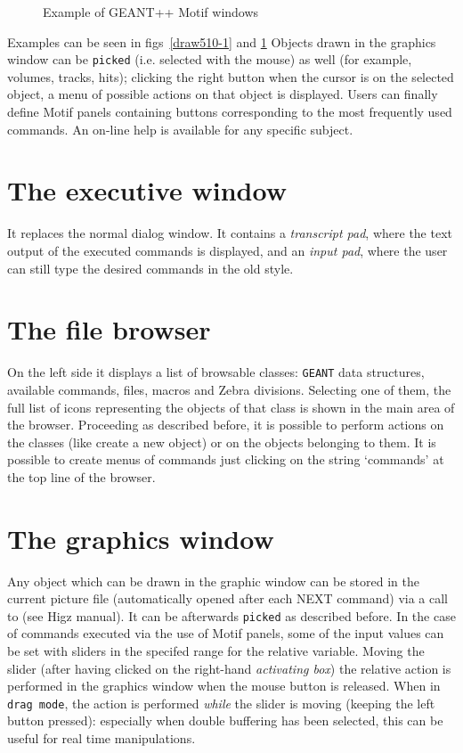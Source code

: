 \begin{figure}[hbt]
\centering
\hspace*{-1.5cm}
\epsfysize=10cm
\label{draw510-2}
\caption{Example of GEANT++ Motif windows}
\end{figure}

Examples can be seen in figs~\ref{draw510-1} and \ref{draw510-2}
Objects drawn in the graphics window can be {\tt picked} 
(i.e. selected with the mouse) as well (for example,
volumes, tracks, hits); clicking the right button when the cursor is on the
selected object, a menu of possible actions on that object is displayed.
Users can finally define Motif panels containing buttons corresponding to the
most frequently used commands. An on-line help is available for any specific
subject.

\section{The executive window}

It replaces the normal dialog window. It contains a {\it transcript pad}, 
where the
text output of the executed commands is displayed, and an {\it input pad}, 
where the
user can still type the desired commands in the old style. \\[1em]

\section{The file browser}

On the left side it displays a list of browsable classes:
{\tt GEANT} data structures, 
available commands, files, macros and Zebra divisions. Selecting one of
them, the full list of icons representing the objects of that class is shown
in the main area of the browser. Proceeding as described before, it is 
possible to perform actions on the classes (like create a new object) or on
the objects belonging to them. It is possible to create menus of commands
just clicking on the string `commands' at the top line of the browser.

\section{The graphics window}

Any object which can be drawn in the graphic window can be stored in the current
picture file (automatically opened after each NEXT command) via a call to 
 (see Higz manual). It can be afterwards {\tt picked}
as described before.
In the case of commands executed via the use of Motif panels, some of the
input values
can be set with sliders in the specifed range for the relative
variable. Moving the slider (after having clicked on the right-hand 
{\it activating
box}) the relative action is performed in the graphics
window when the mouse button is released. When in {\tt drag mode}, the 
action is performed {\it while} the slider is moving (keeping the left button
pressed): especially when double buffering has been selected, this can be
useful for real time manipulations.

